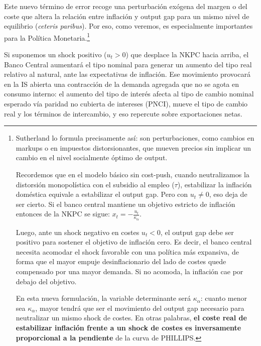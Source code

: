 \documentclass[10pt,a4paper]{article}
\begin{document}
Este nuevo término de error recoge una perturbación exógena del margen o del coste que altera la relación entre inflación y output gap para un mismo nivel de equilibrio (\textit{ceteris paribus}). Por eso, como veremos, es especialmente importantes para la Política Monetaria.\footnote{
  Sutherland lo formula precisamente así: son perturbaciones, como cambios en markups o en impuestos distorsionantes, que mueven precios sin implicar un cambio en el nivel socialmente óptimo de output.
  
  Recordemos que en el modelo básico sin cost-push, cuando neutralizamos la distorsión monopolística con el subsidio al empleo ($\tau$), estabilizar la inflación doméstica equivale a estabilizar el output gap. Pero con $u_t\neq 0$, eso deja de ser cierto. Si el banco central mantiene un objetivo estricto de inflación entonces de la NKPC se sigue: $x_t=-\frac{u_t}{\kappa_\alpha}$.
  
  Luego, ante un shock negativo en costes $u_t<0$, el output gap debe ser positivo para sostener el objetivo de inflación cero. Es decir, el banco central necesita acomodar el shock favorable con una política más expansiva, de forma que el mayor empuje desinflacionario del lado de costes quede compensado por una mayor demanda. Si no acomoda, la inflación cae por debajo del objetivo. 
  
  En esta nueva formulación, la variable determinante será $\kappa_\alpha$: cuanto menor sea $\kappa_\alpha$, mayor tendrá que ser el movimiento del output gap necesario para neutralizar un mismo shock de costes. En otras palabras, \textbf{el coste real de estabilizar inflación frente a un shock de costes es inversamente proporcional a la pendiente} de la curva de PHILLIPS.
} 

Si suponemos un shock positivo ($u_t>0$) que desplace la NKPC hacia arriba, el Banco Central aumentará el tipo nominal para generar un aumento del tipo real relativo al natural, ante las expectativas de inflación. Ese movimiento provocará en la IS abierta una contracción de la demanda agregada que no se agota en consumo interno: el aumento del tipo de interés afecta al tipo de cambio nominal esperado vía paridad no cubierta de intereses (PNCI), mueve el tipo de cambio real y los términos de intercambio, y eso repercute sobre exportaciones netas. 
\end{document}
